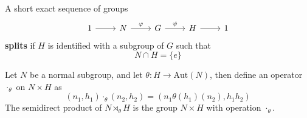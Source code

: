 \documentclass[openany]{book}
\begin{document}
\begin{defn}
    A short exact sequence of groups
    \[\begin{tikzcd}
        1 & N & G & H & 1
        \arrow[from=1-1, to=1-2]
        \arrow["\varphi", from=1-2, to=1-3]
        \arrow["\psi", from=1-3, to=1-4]
        \arrow[from=1-4, to=1-5]
    \end{tikzcd}\]
    \textbf{splits} if $H$ is identified with a subgroup of $G$ such that 
    \begin{equation*}
        N\cap H=\{e\}
    \end{equation*}
\end{defn}


\begin{defn}
    Let $N$ be a normal subgroup, and let $\theta: H\to\text{Aut}(N)$, then define an operator $\cdot_\theta$ on $N\times H$ as 
    \begin{equation*}
        (n_1,h_1)\cdot_\theta(n_2,h_2)=(n_1\theta(h_1)(n_2), h_1h_2)
    \end{equation*}
    The semidirect product of $N\rtimes_\theta H$ is the group $N\times H$ with operation $\cdot_\theta$.
\end{defn}

\end{document}
